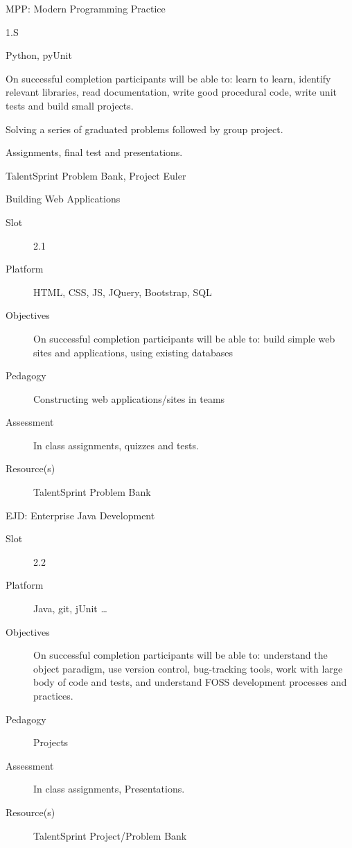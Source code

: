 \documentclass[12pt]{beamer}
\begin{document}
{\begin{frame}{MPP: Modern Programming Practice}
  \begin{description}[Resource(S)]
  \item[Slot] 1.S
  \item[Platform] Python, pyUnit
  \item[Objectives] On successful completion participants will be able to: learn to learn, identify relevant libraries, read documentation, write good procedural code, write unit tests and build small projects.
  \item[Pedagogy] Solving a series of graduated problems followed by group project.
  \item[Assessment] Assignments, final test and presentations.
  \item[Resource(s)] TalentSprint Problem Bank, Project Euler
  \end{description}
\end{frame}

\begin{frame}{Building Web Applications}
  \begin{description}
  \item[Slot] 2.1
  \item[Platform] HTML, CSS, JS, JQuery, Bootstrap, SQL
  \item[Objectives] On successful completion participants will be able to: build simple web sites and applications, using existing databases
  \item[Pedagogy] Constructing  web applications/sites in teams
  \item[Assessment] In class assignments, quizzes and tests.
  \item[Resource(s)] TalentSprint Problem Bank
  \end{description}
\end{frame}

\begin{frame}{EJD: Enterprise Java Development}
  \begin{description}
    \item[Slot] 2.2
  \item[Platform] Java, git, jUnit \ldots
  \item[Objectives] On successful completion participants will be able to: understand the object paradigm, use version control, bug-tracking tools, work with large body of code and tests, and understand FOSS development processes and practices.
  \item[Pedagogy] Projects
  \item[Assessment] In class assignments, Presentations.
  \item[Resource(s)] TalentSprint Project/Problem Bank
  \end{description}
\end{frame}

}
\end{document}
